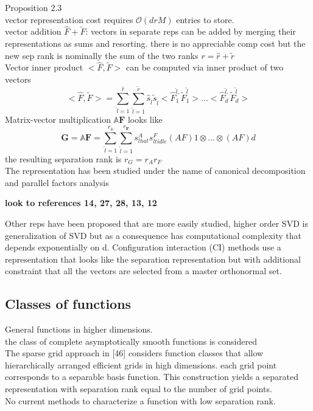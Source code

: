 \documentclass[10pt, draft]{article}
\begin{document}
 Proposition 2.3\\
 vector representation cost requires $\mathcal{O}(d r M)$ entries to store.\\
 vector addition $\hat{F} + \tilde{F}$: vectors in separate reps can be added by merging their representations as sums and resorting.  there is no appreciable comp cost but the new sep rank is nominally the sum of the two ranks $r = \hat{r} + \tilde{r}$\\
 Vector inner product $ <\hat{F} , \tilde{F}>$ can be computed via inner product of two vectors 
 \[ <\hat{F}, \tilde{F}> = \sum_{\hat{l}=1}^{\hat{r}} \sum_{\tilde{l}=1}^{\tilde{r}} \hat{s}_{\hat{l}}\tilde{s}_{\tilde{l}}<\hat{F}_1^{\hat{l},} \tilde{F}_1^{\tilde{l}}> ... < \hat{F}_d^{\hat{l},} \tilde{F}_d^{\tilde{l}}> \]
 Matrix-vector multiplication $\mathbb{A}\textbf{F}$ looks like 
 \[\textbf{G} = \mathbb{A} \textbf{F} =  \sum_{\hat{l}=1}^{r_{\mathbb{A}}} \sum_{\tilde{l}=1}^{r_{\textbf{F}}} s_{lhat}^{A}s_{ltidle}^F (AF)1 \otimes ... \otimes (AF)d\]
 the resulting separation rank is $r_G = r_A r_F$\\
 The representation has been studied under the name of canonical decomposition and parallel factors analysis\linebreak[1]
 
 \textbf{look to references 14, 27, 28, 13, 12}\linebreak[1]
 
 Other reps have been proposed that are more easily studied, higher order SVD is generalization of SVD but as a consequence has computational complexity that depends exponentially on d.  Configuration interaction (CI) methods use a representation that looks like the separation representation but with additional constraint that all the vectors are selected from a master orthonormal set.\\
 
 
 \subsection{Classes of functions}
 General functions in higher dimensions.  \\
 the class of complete asymptotically smooth functions is considered\\
 The sparse grid approach in [46] considers function classes that allow hierarchically arranged efficient grids in high dimensions.  each grid point corresponds to a separable basis function.  This construction yields a separated representation with separation rank equal to the number of grid points.  \\
 No current methods to characterize a function with low separation rank.  
 
\end{document}
